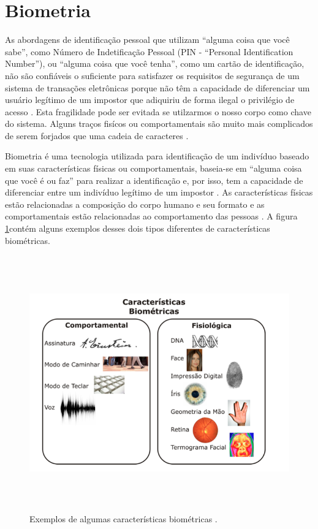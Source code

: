 \section{Biometria}

As abordagens de identificação pessoal que utilizam ``alguma coisa que você sabe'', como Número de Indetificação Pessoal (PIN - ``Personal Identification Number''), ou ``alguma coisa que você tenha'', como um cartão de identificação, não são confiáveis o suficiente para satisfazer os requisitos de segurança de um sistema de transações eletrônicas porque não têm a capacidade de diferenciar um usuário legítimo de um impostor que adiquiriu de forma ilegal o privilégio de acesso \cite{hong}. Esta fragilidade pode ser evitada se utilzarmos o nosso corpo como chave do sistema. Alguns traços fisícos ou comportamentais são muito mais complicados de serem forjados que uma cadeia de caracteres \cite{drovetto}.

Biometria é uma tecnologia utilizada para identificação de um indivíduo baseado em suas características físicas ou comportamentais, baseia-se em ``alguma coisa que você é ou faz'' para realizar a identificação e, por isso, tem a capacidade de diferenciar entre um indivíduo legítimo de um impostor \cite{hong}. As características físicas estão relacionadas a composição do corpo humano e seu formato e as comportamentais estão relacionadas ao comportamento das pessoas \cite{drovetto}. A figura \ref{caracteristicasBiometricas}contém alguns exemplos desses dois tipos diferentes de características biométricas.

	\begin{figure}[hbt]
		\begin{center}
			\includegraphics[height=11cm,width=17cm]{figuras/2.FundamentacaoTeorica/caracteristicasBiometricas.png}
		\end{center}
		\caption{Exemplos de algumas características biométricas \cite{drovetto}.}
		\label{caracteristicasBiometricas}
	\end{figure}

